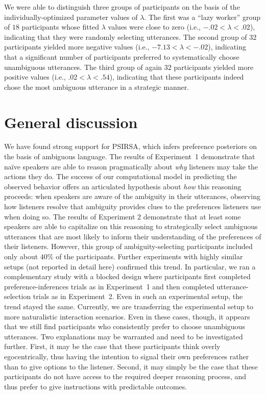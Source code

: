 \documentclass[10pt,a4paper]{article}
\newcommand{\gcs}[1]{\textcolor{blue}{[gcs: #1]}}
\begin{document}
We were able to distinguish three groups of participants on the basis of the individually-optimized parameter values of $\lambda$. 
The first was a ``lazy worker'' group of $18$ participants whose fitted $\lambda$ values were close to zero (i.e.,  $-.02 < \lambda<.02$), indicating that they were randomly selecting utterances.
The second group of $32$ participants yielded more negative values (i.e., $-7.13<\lambda<-.02$), indicating that a significant number of participants preferred to systematically choose unambiguous utterances. 
The third group of again $32$ participants yielded more positive values (i.e., $.02<\lambda<.54$), indicating that these participants indeed chose the most ambiguous utterance in a strategic manner. 

\section{General discussion}

We have found strong support for PSIRSA, which infers preference posteriors on the basis of ambiguous language.
The results of Experiment~1 demonstrate that na\"ive speakers are able to reason pragmatically about \emph{why} listeners may take the actions they do. 
The success of our computational model in predicting the observed behavior offers an articulated hypothesis about \emph{how} this reasoning proceeds: when speakers are aware of the ambiguity in their utterances, observing how listeners resolve that ambiguity provides clues to the preferences listeners use when doing so.
The results of Experiment 2 demonstrate that at least some speakers are able to capitalize on this reasoning to strategically select ambiguous utterances that are most likely to inform their understanding of the preferences of their listeners.
However, this group of ambiguity-selecting participants included only about $40\%$ of the participants. 
Further experiments with highly similar setups (not reported in detail here) confirmed this trend. 
In particular, we ran a complementary study with a blocked design where participants first completed preference-inferences trials as in Experiment~1 and then completed utterance-selection trials as in Experiment~2. 
Even in such an experimental setup, the trend stayed the same. 
Currently, we are transferring the experimental setup to more naturalistic interaction scenarios. 
Even in these cases, though, it appears that we still find participants who consistently prefer to choose unambiguous utterances. 
Two explanations may be warranted and need to be investigated further. 
First, it may be the case that these participants think overly egocentrically, thus having the intention to signal their own preferences rather than to give options to the listener. 
Second, it may simply be the case that these participants do not have access to the required deeper reasoning process, and thus prefer to give instructions with predictable outcomes. 
\end{document}

